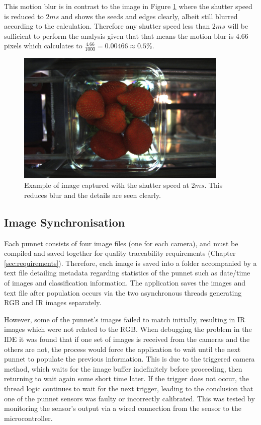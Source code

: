 \documentclass[fleqn,twoside,12pt]{report}
\begin{document}
This motion blur is in contrast to the image in Figure \ref{fig:sharp_1} where the shutter speed is reduced to $2ms$ and shows the seeds and edges clearly, albeit still blurred according to the calculation. Therefore any shutter speed less than $2ms$ will be sufficient to perform the analysis given that that means the motion blur is $4.66$ pixels which calculates to $\frac{4.66}{1000} = 0.00466 \approx 0.5\%$.

\begin{figure}[h]
	\centering
	\includegraphics[width=0.9\textwidth]{sharp_1.jpg}
	\caption{Example of image captured with the shutter speed at $2ms$. This reduces blur and the details are seen clearly.}
	\label{fig:sharp_1}
\end{figure}


\subsection{Image Synchronisation}
\label{sec:img_sync}

Each punnet consists of four image files (one for each camera), and must be compiled and saved together for quality traceability requirements (Chapter \ref{sec:requirements}). Therefore, each image is saved into a folder accompanied by a text file detailing metadata regarding statistics of the punnet such as date/time of images and classification information. The application saves the images and text file after population occurs via the two asynchronous threads generating RGB and IR images separately. 

However, some of the punnet's images failed to match initially, resulting in IR images which were not related to the RGB. When debugging the problem in the IDE it was found that if one set of images is received from the cameras and the others are not, the process would force the application to wait until the next punnet to populate the previous information. This is due to the triggered camera method, which waits for the image buffer indefinitely before proceeding, then returning to wait again some short time later. If the trigger does not occur, the thread logic continues to wait for the next trigger, leading to the conclusion that one of the punnet sensors was faulty or incorrectly calibrated. This was tested by monitoring the sensor's output via a wired connection from the sensor to the microcontroller. 
\end{document}

